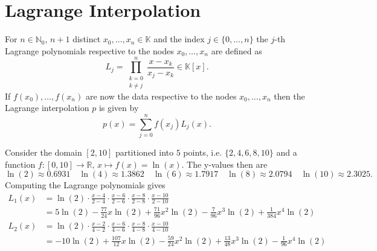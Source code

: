 \section{Lagrange Interpolation}

\begin{definition}
    For \(n \in \mathbb{N}_0\), \(n + 1\) distinct \(x_0, \ldots, x_n \in \mathbb{K}\) and the index \(j \in \{0, \ldots, n\}\) the \(j\)-th Lagrange polynomials respective to the nodes \(x_0, \ldots, x_n\) are defined as
    \begin{equation}
        L_j = \prod_{\substack{k=0 \\ k \neq j}}^n \frac{x - x_k}{x_j - x_k} \in \mathbb{K}[x] \text{.}
    \end{equation}
    If \(f(x_0), \ldots, f(x_n)\) are now the data respective to the nodes \(x_0, \ldots, x_n\) then the Lagrange interpolation \(p\) is given by
    \begin{equation}
        p(x) = \sum_{j=0}^n f(x_j) L_j(x) \text{.}
    \end{equation}
\end{definition}

\begin{example}
    Consider the domain \([2, 10]\) partitioned into \(5\) points, i.e. \(\{2, 4, 6, 8, 10\}\) and a function \(f: [0, 10] \rightarrow \mathbb{R}, \, x \mapsto f(x) = \ln(x)\). The y-values then are
    \begin{equation}
        \ln(2) \approx 0.6931 \quad \ln(4) \approx 1.3862 \quad \ln(6) \approx 1.7917 \quad \ln(8) \approx 2.0794 \quad \ln(10) \approx 2.3025 \text{.}
    \end{equation}
    Computing the Lagrange polynomials gives
    \begin{align}
        L_1 (x) &= \ln(2) \cdot \frac{x - 4}{2 - 4} \cdot \frac{x - 6}{2 - 6} \cdot \frac{x - 8}{2 - 8} \cdot \frac{x - 10}{2 - 10} \\
        &= 5 \ln(2) - \frac{77}{24} x \ln(2) + \frac{71}{96} x^2 \ln(2) - \frac{7}{96} x^3 \ln(2) + \frac{1}{384} x^4 \ln(2) \\
        L_2 (x) &= \ln(2) \cdot \frac{x - 2}{4 - 2} \cdot \frac{x - 6}{4 - 6} \cdot \frac{x - 8}{4 - 8} \cdot \frac{x - 10}{4 - 10} \\
        &= -10 \ln(2) + \frac{107}{12} x \ln(2) - \frac{59}{24} x^2 \ln(2) + \frac{13}{48} x^3 \ln(2) - \frac{1}{96} x^4 \ln(2)
    \end{align}
\end{example}

